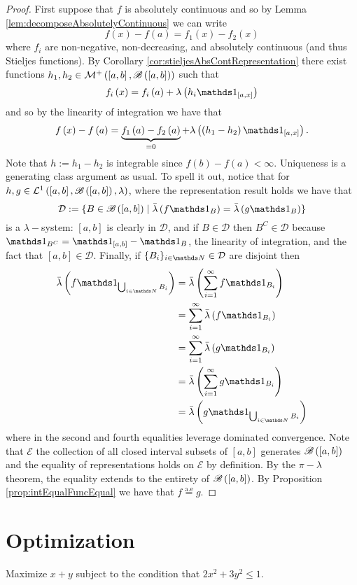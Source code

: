 \begin{proof}
First suppose that $f$ is absolutely continuous and so by Lemma \ref{lem:decomposeAbsolutelyContinuous}
we can write 
\[
f\left(x\right)-f\left(a\right)=f_{1}\left(x\right)-f_{2}\left(x\right)
\]
where $f_{i}$ are non-negative, non-decreasing, and absolutely continuous
(and thus Stieljes functions). By Corollary \ref{cor:stieljesAbsContRepresentation}
there exist functions $h_{1},h_{2}\in\mathcal{M}^{+}\left(\left[a,b\right],\mathscr{B}\left(\left[a,b\right]\right)\right)$
such that
\[
f_{i}\left(x\right)=f_{i}\left(a\right)+\lambda\left(h_{i}\indicate_{\left[a,x\right]}\right)
\]
and so by the linearity of integration we have that 
\[
f\left(x\right)-f\left(a\right)=\underbrace{f_{1}\left(a\right)-f_{2}\left(a\right)}_{=0}+\lambda\left(\left(h_{1}-h_{2}\right)\indicate_{\left[a,x\right]}\right).
\]
Note that $h:=h_{1}-h_{2}$ is integrable since $f\left(b\right)-f\left(a\right)<\infty$.
Uniqueness is a generating class argument as usual. To spell it out, notice that for  $h,g\in\mathcal{L}^{1}\left(\left[a,b\right],\mathscr{B}\left(\left[a,b\right]\right),\lambda\right)$, where the representation result holds we have that 
\[
	\mathcal{D} : = \{ B \in \borel \left(\left[a,b\right] \right) \mid \lebInt{\lambda}{f\indicate_{B}} = \lebInt{\lambda}{g\indicate_{B}} \}
\]
is a $\lambda-$system: $\left[a,b\right]$ is clearly in $\mathcal{D}$, and if $B \in \mathcal{D}$ then $B^C \in \mathcal{D}$ because $\indicate_{B^C} = \indicate_{[a,b]} - \indicate_{B}$, the linearity of integration, and the fact that $[a,b] \in \mathcal{D}$. Finally, if $\{B_i\}_{i\in\N} \in \mathcal{D}$ are disjoint then 
\begin{align*}
	\lebInt{\lambda}{f\indicate_{\bigcup_{i\in\N}B_i}} &= \lebInt{\lambda}{\sum_{i=1}^\infty f \indicate_{B_i}} \\
	&= \sum_{i=1}^\infty \lebInt{\lambda}{f\indicate_{B_i}} \\
	&=  \sum_{i=1}^\infty \lebInt{\lambda}{g\indicate_{B_i}} \\
	&= \lebInt{\lambda}{\sum_{i=1}^{\infty}g\indicate_{B_i}} \\
	&= 	\lebInt{\lambda}{g\indicate_{\bigcup_{i\in\N}B_i}}
\end{align*}
where in the second and fourth equalities leverage dominated convergence. Note that $\mathcal{E}$ the collection of all closed interval subsets of $[a,b]$ generates $\mathscr{B}\left([a,b]\right)$ and the equality of representations holds on $\mathcal{E}$ by definition. By the $\pi-\lambda$ theorem, the equality extends to the entirety of $\mathscr{B}\left([a,b]\right)$. By Proposition \ref{prop:intEqualFuncEqual} we have that $f \stackrel{\text{a.e}}{=} g $.
\end{proof}
%

\section{Optimization\label{sec:optimization}}
\begin{example}
\label{exa:isi2006samplepsb2}Maximize $x+y$ subject to the condition
that $2x^{2}+3y^{2}\leq1$.
\end{example}


